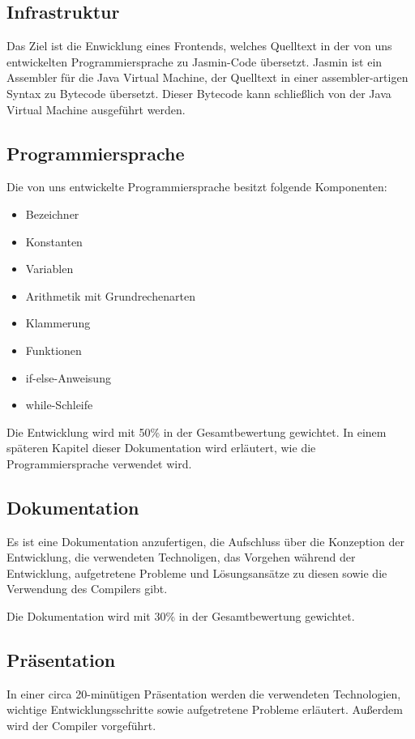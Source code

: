\documentclass[12pt, a4paper, oneside, ngerman]{article}
\begin{document}
\subsection{Infrastruktur}
Das Ziel ist die Enwicklung eines Frontends, welches Quelltext in der von uns entwickelten Programmiersprache zu Jasmin-Code übersetzt. 
Jasmin ist ein Assembler für die Java Virtual Machine, der Quelltext in einer assembler-artigen Syntax zu Bytecode übersetzt. 
Dieser Bytecode kann schließlich von der Java Virtual Machine ausgeführt werden.


\subsection{Programmiersprache}
Die von uns entwickelte Programmiersprache besitzt folgende Komponenten: 
\begin{itemize}
\item Bezeichner
\item Konstanten
\item Variablen
\item Arithmetik mit Grundrechenarten
\item Klammerung
\item Funktionen
\item if-else-Anweisung
\item while-Schleife
\end{itemize}
\noindent
Die Entwicklung wird mit 50\% in der Gesamtbewertung gewichtet.
In einem späteren Kapitel dieser Dokumentation wird erläutert, wie die Programmiersprache verwendet wird.

\subsection{Dokumentation}
Es ist eine Dokumentation anzufertigen, die Aufschluss über die Konzeption der Entwicklung, die verwendeten Technoligen, das Vorgehen während der Entwicklung, aufgetretene Probleme und Lösungsansätze zu diesen sowie die Verwendung des Compilers gibt.

Die Dokumentation wird mit 30\% in der Gesamtbewertung gewichtet.

\subsection{Präsentation}
In einer circa 20-minütigen Präsentation werden die verwendeten Technologien, wichtige Entwicklungsschritte sowie aufgetretene Probleme erläutert. Außerdem wird der Compiler vorgeführt. 
\end{document}
